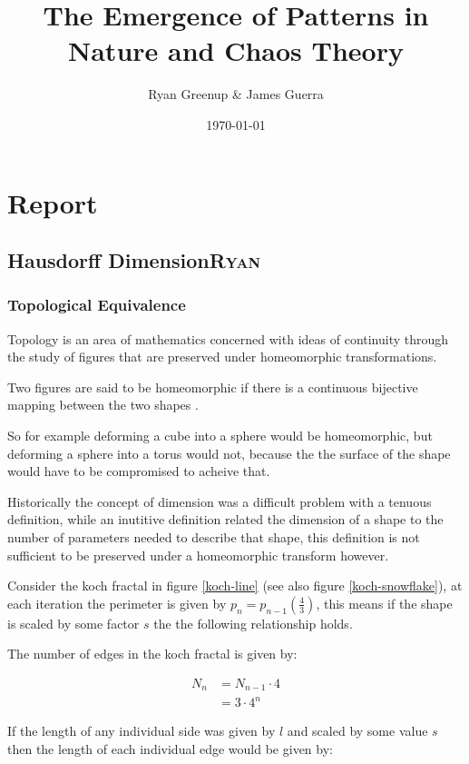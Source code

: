 \documentclass[11pt]{article}
\author{Ryan Greenup \& James Guerra}
\date{\today}
\title{The Emergence of Patterns in Nature and Chaos Theory}
\begin{document}
\maketitle
\tableofcontents

\section{Report}
\label{sec:orge470beb}
\subsection{Hausdorff Dimension\hfill{}\textsc{Ryan}}
\label{sec:org30f1c04}
\subsubsection{Topological Equivalence}
\label{sec:orge690e4e}
Topology is an area of mathematics concerned with ideas of continuity through the study of figures that are preserved under homeomorphic transformations. \cite{gilmoreTopologyChaosAlice2002}

Two figures are said to be homeomorphic if there is a continuous bijective mapping between the two shapes \cite[p. 105]{peitgenChaosFractalsNew2004}.

So for example deforming a cube into a sphere would be homeomorphic, but deforming a sphere into a torus would not, because the the surface of the shape would have to be compromised to acheive that.

Historically the concept of dimension was a difficult problem with a tenuous
definition, while an inutitive definition related the dimension of a shape to
the number of parameters needed to describe that shape, this definition is not
sufficient to be preserved under a homeomorphic transform however.

Consider the koch fractal in figure \ref{koch-line} (see also figure \ref{koch-snowflake}), at each iteration the perimeter is given by \(p_{n}=p_{n-1}  \left(\frac{4}{3} \right)\), this means if the shape is scaled by some factor \(s\) the the following relationship holds.

The number of edges in the koch fractal is given by:

\begin{align}
N_{n} &= N_{n-1} \cdot 4 \\
&= 3 \cdot 4^{n}
\end{align}

If the length of any individual side was given by \(l\) and scaled by some value \(s\) then the length of each individual edge would be given by:
\end{document}
